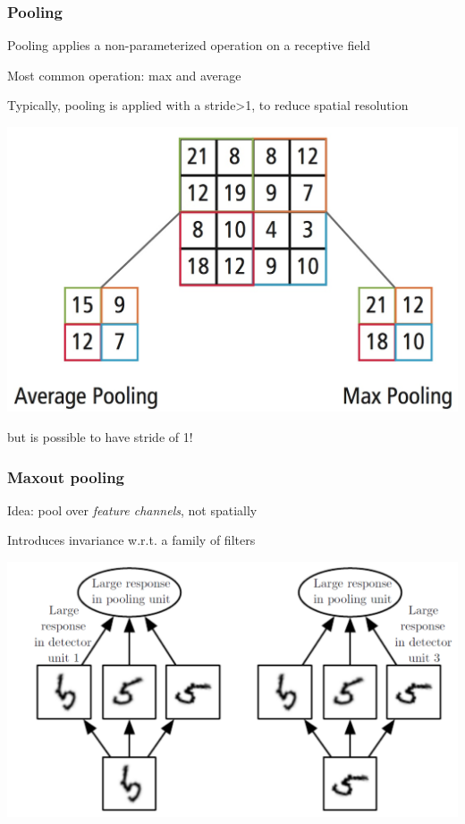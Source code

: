 \documentclass[xcolor=dvipsnames]{beamer}
\begin{document}
\begin{frame}
  \frametitle{Pooling}
  \bi
\item Pooling applies a non-parameterized operation on a receptive
  field
\item Most common operation: max and average
\ei
\begin{minipage}[c]{.5\linewidth}
\bi
\item Typically, pooling is applied with a stride\textgreater 1, to
  reduce spatial resolution

\ei  
\end{minipage}%
\begin{minipage}[c]{.5\linewidth}
  \includegraphics[width=.95\textwidth]{pooling}
\end{minipage}
\bi
\item but is possible to have stride of 1!
\ei
\end{frame}

\begin{frame}
  \frametitle{Maxout pooling}
  \bi
\item Idea: pool over \emph{feature channels}, not spatially
\item Introduces invariance w.r.t. a family of filters

\includegraphics[width=.6\textwidth]{gcb-maxout}~\raisebox{1em}{[Goodfellow
  et al.]}

\ei

\end{frame}
\end{document}
